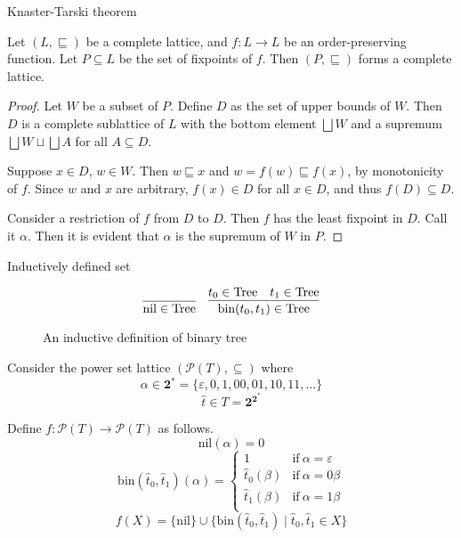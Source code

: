 \documentclass[9pt]{beamer}
\newcommand\pow[1]{\mathcal{P}(#1)}
\newcommand\two[0]{\mathbf{2}}
\newcommand\Tree[0]{\text{Tree}}
\newcommand\nil[0]{\text{nil}}
\newcommand\bin[0]{\text{bin}}
\begin{document}
\begin{frame}{Knaster-Tarski theorem}
  \begin{theorem}
    Let $(L,\sqsubseteq)$ be a complete lattice, and $f : L \to L$ be an order-preserving function. Let $P \subseteq L$ be the set of fixpoints of $f$. Then $(P, \sqsubseteq)$ forms a complete lattice.
  \end{theorem}
  \begin{proof}
    Let $W$ be a subset of $P$.
    Define $D$ as the set of upper bounds of $W$.
    Then $D$ is a complete sublattice of $L$ with the bottom element $\bigsqcup W$ and
    a supremum $\bigsqcup W \sqcup \bigsqcup A$ for all $A \subseteq D$.

    Suppose $x \in D$, $w \in W$.
    Then $w \sqsubseteq x$ and $w = f(w) \sqsubseteq f(x)$, by monotonicity of $f$.
    Since $w$ and $x$ are arbitrary, $f(x) \in D$ for all $x \in D$, and thus $f(D) \subseteq D$.

    Consider a restriction of $f$ from $D$ to $D$.
    Then $f$ has the least fixpoint in $D$. Call it $\alpha$.
    Then it is evident that $\alpha$ is the supremum of $W$ in $P$.
  \end{proof}
\end{frame}

\begin{frame}{Inductively defined set}
  \begin{figure}
  \[
    \infer
    {\nil \in \Tree}
    { }
    \quad
    \infer
    {\bin(t_0,t_1) \in \Tree}
    {t_0 \in \Tree & t_1 \in \Tree}
  \]
  \caption{An inductive definition of binary tree}
  \end{figure}

  \pause
  Consider the power set lattice $(\pow{T}, \subseteq)$ where
  $$\alpha \in \two^* = \{\varepsilon, 0, 1, 00, 01, 10, 11, ...\}$$
  $$\hat t \in T = \two^{\two^*}$$

  Define $f : \pow{T} \to \pow{T}$ as follows.
  $$ \nil(\alpha) = 0 $$
  $$\bin(\hat t_0, \hat t_1)(\alpha) = \begin{cases}
    1               & \text{if} \ \alpha = \varepsilon \\
    \hat t_0(\beta) & \text{if} \ \alpha = 0\beta \\
    \hat t_1(\beta) & \text{if} \ \alpha = 1\beta \\
    \end{cases}
  $$
  $$ f(X) = \{\nil\} \cup \{\bin(\hat t_0,\hat t_1) \mid \hat t_0, \hat t_1 \in X\} $$
\end{frame}
\end{document}
